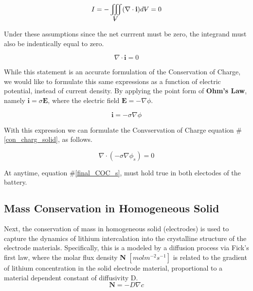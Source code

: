 \documentclass[lettersize,journal]{IEEEtran}
\newcommand{\volume}{{\ooalign{\hfil$V$\hfil\cr\kern0.08em--\hfil\cr}}}
\begin{document}
\begin{equation}
    I = - \iiint_{\volume} (\nabla \cdot \textbf{i})d{\volume} = 0
\end{equation}

Under these assumptions since the net currrent must be zero, the integrand must also be indentically equal to zero.

\begin{equation} \label{con_charg_solid}
    \nabla \cdot \textbf{i} = 0
\end{equation}

While this statement is an accurate formulation of the Conservation of Charge, we would like to formulate this same expressions as a function of electric potential, instead of current density. By applying the point form of \textbf{Ohm's Law}, namely $\textbf{i} = \sigma\textbf{E}$, where the electric field $\textbf{E} = -\nabla \phi$.

\begin{equation} \label{ohms_law}
  \textbf{i} = -\sigma \nabla \phi
\end{equation}

\noindent With this expression we can formulate the Convservation of Charge equation \#\ref{con_charg_solid}, as follows.

\begin{equation} \label{final_COC_s}
  \nabla \cdot (-\sigma \nabla \phi_s) = 0
\end{equation}


At anytime, equation \#\ref{final_COC_s}, must hold true in both electodes of the battery.

\subsection{Mass Conservation in Homogeneous Solid}

Next, the conservation of mass in homogeneous solid (electrodes) is used to capture the dynamics of lithium intercalation into the crystalline structure of the electrode materials. Specifically, this is a modeled by a diffusion process via Fick's first law, where the molar flux density \textbf{N} $[mol m^{-2} s^{-1}]$ is related to the gradient of lithium concentration in the solid electrode material, proportional to a material dependent constant of diffusivity D.
\begin{equation}\label{ficks_first}
    \textbf{N} =  -D \nabla c
\end{equation}
\end{document}
